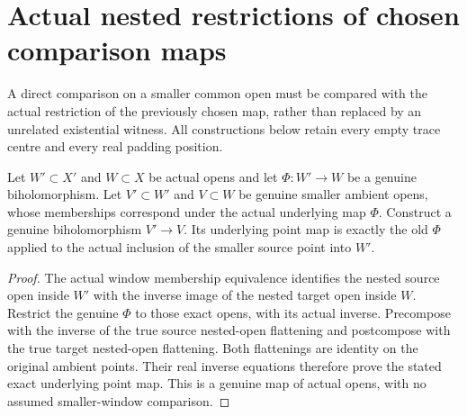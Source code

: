 \section{Actual nested restrictions of chosen comparison maps}

A direct comparison on a smaller common open must be compared with the
actual restriction of the previously chosen map, rather than replaced by
an unrelated existential witness. All constructions below retain every
empty trace centre and every real padding position.

\begin{lemma}
\label{hir:sharp-actual-nested-comparison-base}
\leanok
Let $W'\subset X'$ and $W\subset X$ be actual opens and let
$\Phi:W'\to W$ be a genuine biholomorphism. Let $V'\subset W'$ and
$V\subset W$ be genuine smaller ambient opens, whose memberships correspond
under the actual underlying map $\Phi$. Construct a genuine biholomorphism
$V'\to V$. Its underlying point map is exactly the old $\Phi$ applied to
the actual inclusion of the smaller source point into $W'$.
\end{lemma}
\begin{proof}
The actual window membership equivalence identifies the nested source open
inside $W'$ with the inverse image of the nested target open inside $W$.
Restrict the genuine $\Phi$ to those exact opens, with its actual inverse.
Precompose with the inverse of the true source nested-open flattening and
postcompose with the true target nested-open flattening. Both flattenings
are identity on the original ambient points. Their real inverse equations
therefore prove the stated exact underlying point map. This is a genuine
map of actual opens, with no assumed smaller-window comparison.
\end{proof}

